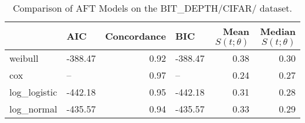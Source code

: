\begin{table}
\caption{Comparison of AFT Models on the BIT_DEPTH/CIFAR/ dataset.}
\label{tab:bit_depth/cifar/}
\begin{tabular}{llrlrr}
\toprule
 & AIC & Concordance & BIC & Mean $S(t;\theta)$ & Median $S(t;\theta)$ \\
\midrule
weibull & -388.47 & 0.92 & -388.47 & 0.38 & 0.30 \\
cox & -- & 0.97 & -- & 0.24 & 0.27 \\
log_logistic & -442.18 & 0.95 & -442.18 & 0.31 & 0.28 \\
log_normal & -435.57 & 0.94 & -435.57 & 0.33 & 0.29 \\
\bottomrule
\end{tabular}
\end{table}
